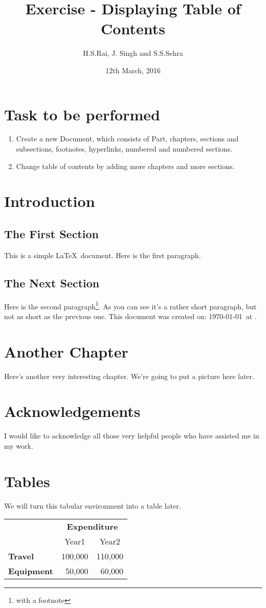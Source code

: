 \documentclass[12pt]{report}
\title{Exercise  -  Displaying Table of Contents}
\author{H.S.Rai, J. Singh and S.S.Sehra}
\date{12th March, 2016}
\begin{document}
\maketitle

\tableofcontents


\chapter{Task to be performed}
\begin{enumerate}
	\item Create a new Document, which consists of Part, chapters, sections and subsections, footnotes, hyperlinks, numbered and numbered sections.
	\item Change table of contents by adding more chapters and more sections.
\end{enumerate}

\chapter{Introduction}

\section{The First Section}

This is a simple \LaTeX\ document.
Here is the first paragraph.

\section{The Next Section}

Here is the second paragraph\footnote{with a footnote}. 
As you can see it's a rather short paragraph, but not 
as short as the previous one. This document was 
created on: \today\ at \currenttime.

\chapter{Another Chapter}

Here's another very interesting chapter.
We're going to put a picture here later.

\chapter*{Acknowledgements}

I would like to acknowledge all those
very helpful people who have assisted
me in my work.

\appendix
\chapter{Tables}

We will turn this tabular environment into a table later.

\begin{tabular}{lrr}
 & \multicolumn{2}{c}{\bfseries Expenditure}\\
 & \multicolumn{1}{c}{Year1} & \multicolumn{1}{c}{Year2}\\
\bfseries Travel & 100,000 & 110,000\\
\bfseries Equipment & 50,000 & 60,000
\end{tabular}
\end{document}
